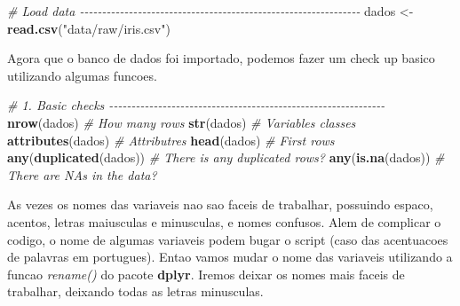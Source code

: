 \documentclass[
]{book}
\newenvironment{Shaded}{\begin{snugshade}}{\end{snugshade}}
\newcommand{\CommentTok}[1]{\textcolor[rgb]{0.56,0.35,0.01}{\textit{#1}}}
\newcommand{\FunctionTok}[1]{\textcolor[rgb]{0.13,0.29,0.53}{\textbf{#1}}}
\newcommand{\NormalTok}[1]{#1}
\newcommand{\OtherTok}[1]{\textcolor[rgb]{0.56,0.35,0.01}{#1}}
\newcommand{\StringTok}[1]{\textcolor[rgb]{0.31,0.60,0.02}{#1}}
\begin{document}
\begin{Shaded}
\begin{Highlighting}[]

\CommentTok{\# Load data {-}{-}{-}{-}{-}{-}{-}{-}{-}{-}{-}{-}{-}{-}{-}{-}{-}{-}{-}{-}{-}{-}{-}{-}{-}{-}{-}{-}{-}{-}{-}{-}{-}{-}{-}{-}{-}{-}{-}{-}{-}{-}{-}{-}{-}{-}{-}{-}{-}{-}{-}{-}{-}{-}{-}{-}{-}{-}{-}{-}{-}{-}{-}}
\NormalTok{dados }\OtherTok{\textless{}{-}} \FunctionTok{read.csv}\NormalTok{(}\StringTok{"data/raw/iris.csv"}\NormalTok{)}
\end{Highlighting}
\end{Shaded}

Agora que o banco de dados foi importado, podemos fazer um check up basico utilizando algumas funcoes.

\begin{Shaded}
\begin{Highlighting}[]

\CommentTok{\# 1. Basic checks {-}{-}{-}{-}{-}{-}{-}{-}{-}{-}{-}{-}{-}{-}{-}{-}{-}{-}{-}{-}{-}{-}{-}{-}{-}{-}{-}{-}{-}{-}{-}{-}{-}{-}{-}{-}{-}{-}{-}{-}{-}{-}{-}{-}{-}{-}{-}{-}{-}{-}{-}{-}{-}{-}{-}{-}{-}{-}{-}{-}{-}{-}}
\FunctionTok{nrow}\NormalTok{(dados)             }\CommentTok{\# How many rows}
\FunctionTok{str}\NormalTok{(dados)              }\CommentTok{\# Variables classes}
\FunctionTok{attributes}\NormalTok{(dados)       }\CommentTok{\# Attributres}
\FunctionTok{head}\NormalTok{(dados)             }\CommentTok{\# First rows}
\FunctionTok{any}\NormalTok{(}\FunctionTok{duplicated}\NormalTok{(dados))  }\CommentTok{\# There is any duplicated rows?}
\FunctionTok{any}\NormalTok{(}\FunctionTok{is.na}\NormalTok{(dados))       }\CommentTok{\# There are NAs in the data?}
\end{Highlighting}
\end{Shaded}

As vezes os nomes das variaveis nao sao faceis de trabalhar, possuindo espaco, acentos, letras maiusculas e minusculas, e nomes confusos. Alem de complicar o codigo, o nome de algumas variaveis podem bugar o script (caso das acentuacoes de palavras em portugues). Entao vamos mudar o nome das variaveis utilizando a funcao \emph{rename()} do pacote \textbf{dplyr}. Iremos deixar os nomes mais faceis de trabalhar, deixando todas as letras minusculas.
\end{document}
